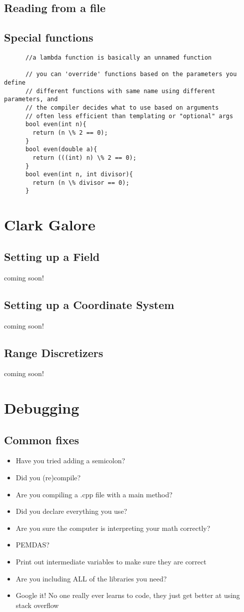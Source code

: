 \documentclass[12pt]{article}
\begin{document}
  \subsection{Reading from a file}
  \subsection{Special functions} %
    \begin{lstlisting}
      //a lambda function is basically an unnamed function
      
      // you can 'override' functions based on the parameters you define
      // different functions with same name using different parameters, and
      // the compiler decides what to use based on arguments
      // often less efficient than templating or "optional" args
      bool even(int n){
        return (n \% 2 == 0);
      }
      bool even(double a){
        return (((int) n) \% 2 == 0);
      }
      bool even(int n, int divisor){
        return (n \% divisor == 0);
      }
    \end{lstlisting}

\section{Clark Galore}
  \subsection{Setting up a Field}
    coming soon!
  \subsection{Setting up a Coordinate System}
    coming soon!
  \subsection{Range Discretizers}
    coming soon!
\section{Debugging}
  \subsection{Common fixes}
    \begin{itemize}
      \item Have you tried adding a semicolon?
      \item Did you (re)compile?
      \item Are you compiling a .cpp file with a main method?
      \item Did you declare everything you use?
      \item Are you sure the computer is interpreting your math correctly?
      \item PEMDAS?
      \item Print out intermediate variables to make sure they are correct
      \item Are you including ALL of the libraries you need?
      \item Google it! No one really ever learns to code, they just get
      better at using stack overflow
    \end{itemize}
\end{document}
